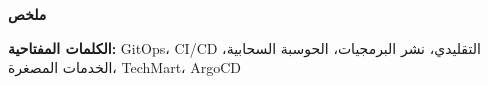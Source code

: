 \thispagestyle{empty}
\vspace*{\fill}

\begin{center}
{\Large \textbf{\textarabic{ملخص}}}
\end{center}

\vspace{1cm}

\begin{otherlanguage}{arabic}
\begin{RTL}

\textbf{الكلمات المفتاحية:} GitOps، CI/CD التقليدي، نشر البرمجيات، الحوسبة السحابية، الخدمات المصغرة، TechMart، ArgoCD
\end{RTL}
\end{otherlanguage}

\vspace*{\fill}
\newpage